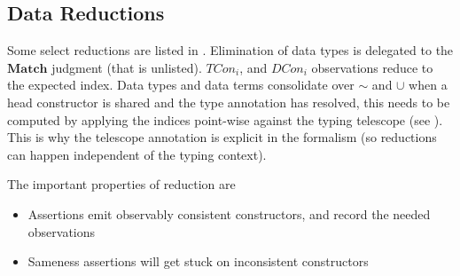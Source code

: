 \subsection{Data Reductions}

Some select reductions are listed in .
Elimination of data types is delegated to the $\mathbf{Match}$ judgment (that is unlisted). 
$TCon_{i}$, and $DCon_{i}$ observations reduce to the expected index.
Data types and data terms consolidate over $\sim$ and $\cup$ when a head constructor is shared and the type annotation has resolved, this needs to be computed by applying the indices point-wise against the typing telescope (see ).
This is why the telescope annotation is explicit in the formalism (so reductions can happen independent of the typing context). 

The important properties of reduction are 
\begin{itemize}
\item Assertions emit observably consistent constructors, and record the needed observations
\item Sameness assertions will get stuck on inconsistent constructors
\end{itemize}


